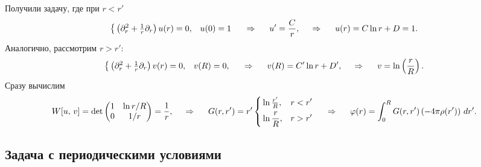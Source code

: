 Получили задачу, где при $r < r'$
\begin{equation*}
    \left\{\begin{aligned}
        &\left(\partial_r^2 + \tfrac{1}{r} \partial_r\right) u(r) = 0,
        &u(0) = 1
    \end{aligned}\right.
    \hspace{0.5cm} \Rightarrow \hspace{0.5cm}
    u' = \frac{C}{r},
    \hspace{0.5cm} \Rightarrow \hspace{0.5cm}
    u(r) = C \ln r + D = 1.
\end{equation*}
Аналогично, рассмотрим $r > r'$:
\begin{equation*}
    \left\{\begin{aligned}
        &\left(\partial_r^2 + \tfrac{1}{r} \partial_r\right) v(r) = 0,
        &v(R) = 0,
    \end{aligned}\right.
    \hspace{0.5cm} \Rightarrow \hspace{0.5cm}  
    v(R) = C' \ln r + D',
    \hspace{0.5cm} \Rightarrow \hspace{0.5cm}   
    v = \ln \left(\frac{r}{R}\right).
\end{equation*}
Сразу вычислим 
\begin{equation*}
    W[u,\,  v] = \det \begin{pmatrix}
        1 & \ln r/R  \\
        0 & 1/r  \\
    \end{pmatrix} = \frac{1}{r},
    \hspace{0.5cm} \Rightarrow \hspace{0.5cm}
    G(r, r') = r' \left\{\begin{aligned}
        & \ln \tfrac{r'}{R}, & r < r' \\
        & \ln \frac{r}{R}, & r > r'
    \end{aligned}\right.
    \hspace{0.5cm} \Rightarrow \hspace{0.5cm}
    \varphi(r) = \int_{0}^{R} G(r, r') \left(- 4 \pi \rho(r')\right) \, d r'.
\end{equation*}




\subsection{Задача с периодическими условиями}

